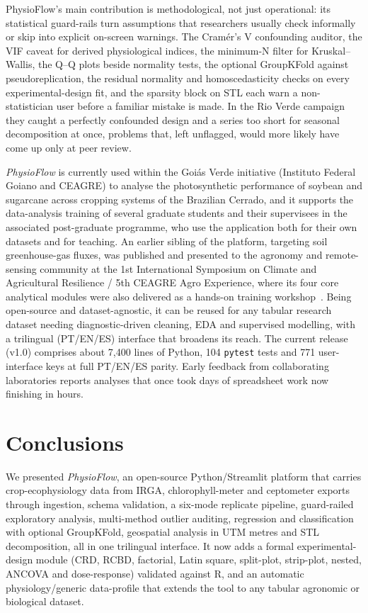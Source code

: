 \documentclass[preprint,12pt,a4paper]{elsarticle}
\begin{document}
PhysioFlow's main contribution is methodological, not just operational: its statistical guard-rails turn assumptions that researchers usually check informally or skip into explicit on-screen warnings. The Cram\'er's V confounding auditor, the VIF caveat for derived physiological indices, the minimum-N filter for Kruskal--Wallis, the Q--Q plots beside normality tests, the optional GroupKFold against pseudoreplication, the residual normality and homoscedasticity checks on every experimental-design fit, and the sparsity block on STL each warn a non-statistician user before a familiar mistake is made. In the Rio Verde campaign they caught a perfectly confounded design and a series too short for seasonal decomposition at once, problems that, left unflagged, would more likely have come up only at peer review.

\emph{PhysioFlow} is currently used within the Goi\'as Verde initiative (Instituto Federal Goiano and CEAGRE) to analyse the photosynthetic performance of soybean and sugarcane across cropping systems of the Brazilian Cerrado, and it supports the data-analysis training of several graduate students and their supervisees in the associated post-graduate programme, who use the application both for their own datasets and for teaching. An earlier sibling of the platform, targeting soil greenhouse-gas fluxes, was published and presented to the agronomy and remote-sensing community at the 1st International Symposium on Climate and Agricultural Resilience / 5th CEAGRE Agro Experience, where its four core analytical modules were also delivered as a hands-on training workshop~\cite{DaSilva2026Goias}. Being open-source and dataset-agnostic, it can be reused for any tabular research dataset needing diagnostic-driven cleaning, EDA and supervised modelling, with a trilingual (PT/EN/ES) interface that broadens its reach. The current release (v1.0) comprises about 7{,}400 lines of Python, 104 \texttt{pytest} tests and 771 user-interface keys at full PT/EN/ES parity. Early feedback from collaborating laboratories reports analyses that once took days of spreadsheet work now finishing in hours.

\section{Conclusions}\label{sec:conclusions}

We presented \emph{PhysioFlow}, an open-source Python/Streamlit platform that carries crop-ecophysiology data from IRGA, chlorophyll-meter and ceptometer exports through ingestion, schema validation, a six-mode replicate pipeline, guard-railed exploratory analysis, multi-method outlier auditing, regression and classification with optional GroupKFold, geospatial analysis in UTM metres and STL decomposition, all in one trilingual interface. It now adds a formal experimental-design module (CRD, RCBD, factorial, Latin square, split-plot, strip-plot, nested, ANCOVA and dose-response) validated against R, and an automatic physiology/generic data-profile that extends the tool to any tabular agronomic or biological dataset.
\end{document}
